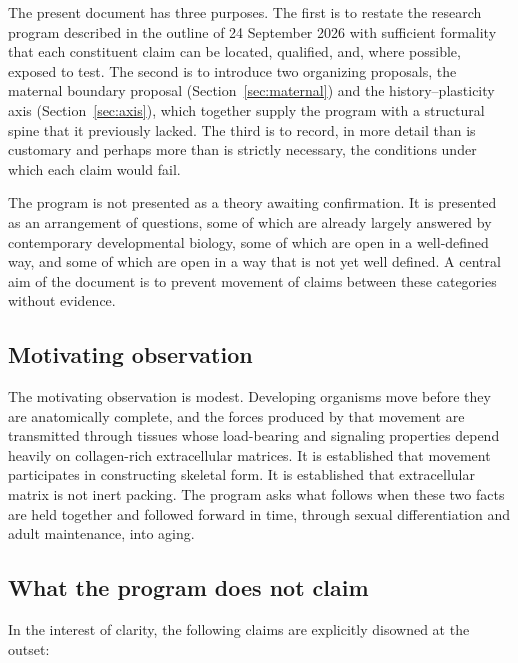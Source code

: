 \documentclass[11pt,a4paper]{article}
\theoremstyle{plain}
\theoremstyle{definition}
\theoremstyle{remark}
\begin{document}
The present document has three purposes. The first is to restate the research program described in the outline of 24 September 2026 with sufficient formality that each constituent claim can be located, qualified, and, where possible, exposed to test. The second is to introduce two organizing proposals, the maternal boundary proposal (Section~\ref{sec:maternal}) and the history--plasticity axis (Section~\ref{sec:axis}), which together supply the program with a structural spine that it previously lacked. The third is to record, in more detail than is customary and perhaps more than is strictly necessary, the conditions under which each claim would fail.

The program is not presented as a theory awaiting confirmation. It is presented as an arrangement of questions, some of which are already largely answered by contemporary developmental biology, some of which are open in a well-defined way, and some of which are open in a way that is not yet well defined. A central aim of the document is to prevent movement of claims between these categories without evidence.

\subsection{Motivating observation}

The motivating observation is modest. Developing organisms move before they are anatomically complete, and the forces produced by that movement are transmitted through tissues whose load-bearing and signaling properties depend heavily on collagen-rich extracellular matrices. It is established that movement participates in constructing skeletal form. It is established that extracellular matrix is not inert packing. The program asks what follows when these two facts are held together and followed forward in time, through sexual differentiation and adult maintenance, into aging.

\subsection{What the program does not claim}

In the interest of clarity, the following claims are explicitly disowned at the outset:
\end{document}
